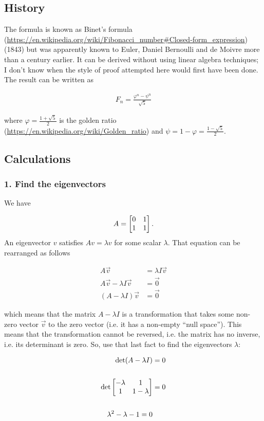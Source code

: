 \subsection*{History}

The formula is known as
Binet's formula (\url{https://en.wikipedia.org/wiki/Fibonacci_number#Closed-form_expression})
(1843) but was apparently known to Euler, Daniel Bernoulli and de Moivre more
than a century earlier. It can be derived without using linear algebra
techniques; I don't know when the style of proof attempted here would first
have been done. The result can be written as

\begin{align*}
F_n = \frac{\varphi^n - \psi^n}{\sqrt{5}}
\end{align*}

where $\varphi = \frac{1+\sqrt{5}}{2}$ is the
golden ratio (\url{https://en.wikipedia.org/wiki/Golden_ratio}) and $\psi = 1 - \varphi = \frac{1 - \sqrt{5}}{2}$.


\subsection*{Calculations}

\subsubsection{1. Find the eigenvectors}
We have

\begin{align*}
A = \begin{bmatrix}0 & 1\\1 & 1\\ \end{bmatrix}.
\end{align*}
An eigenvector $v$ satisfies $Av = \lambda v$ for some scalar $\lambda$. That
equation can be rearranged as follows

\begin{align*}
A\vec v &= \lambda I\vec v
\\
A\vec v - \lambda I\vec v &= \vec 0
\\
(A - \lambda I)\vec v &= \vec 0
\end{align*}

which means that the matrix $A - \lambda I$ is a transformation that takes some
non-zero vector $\vec v$ to the zero vector (i.e. it has a non-empty ``null
space''). This means that the transformation cannot be reversed, i.e. the matrix
has no inverse, i.e. its determinant is zero. So, use that last fact to find
the eigenvectors $\lambda$:

\begin{align*}
\det (A - \lambda I) &= 0
\\
\\
\det \begin{bmatrix}-\lambda & 1\\1           & 1 - \lambda\\ \end{bmatrix} &= 0
\\
\\
\lambda^2 - \lambda - 1 = 0
\end{align*}

